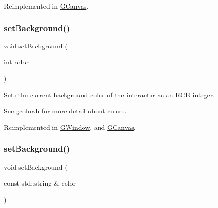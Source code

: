Reimplemented in \mbox{\hyperlink{classsgl_1_1GCanvas_acb65220cc16d17df02a0c08d35b60988}{G\+Canvas}}.

\mbox{\label{classsgl_1_1GDrawingSurface_aba673fd56570a074aba10fa059524b96}} 
\subsubsection{\texorpdfstring{set\+Background()}{setBackground()}\hspace{0.1cm}{\footnotesize\ttfamily [1/2]}}
{\footnotesize\ttfamily void set\+Background (\begin{DoxyParamCaption}\item[{int}]{color }\end{DoxyParamCaption})\hspace{0.3cm}{\ttfamily [virtual]}}



Sets the current background color of the interactor as an R\+GB integer. 

See \mbox{\hyperlink{gcolor_8h_source}{gcolor.\+h}} for more detail about colors. 

Reimplemented in \mbox{\hyperlink{classsgl_1_1GWindow_a10d305826534b55561ea88730fc9f6cd}{G\+Window}}, and \mbox{\hyperlink{classsgl_1_1GCanvas_a10d305826534b55561ea88730fc9f6cd}{G\+Canvas}}.

\mbox{\label{classsgl_1_1GDrawingSurface_ab4677ab2474e68b07aa56605af92a84a}} 
\subsubsection{\texorpdfstring{set\+Background()}{setBackground()}\hspace{0.1cm}{\footnotesize\ttfamily [2/2]}}
{\footnotesize\ttfamily void set\+Background (\begin{DoxyParamCaption}\item[{const std\+::string \&}]{color }\end{DoxyParamCaption})\hspace{0.3cm}{\ttfamily [virtual]}}



